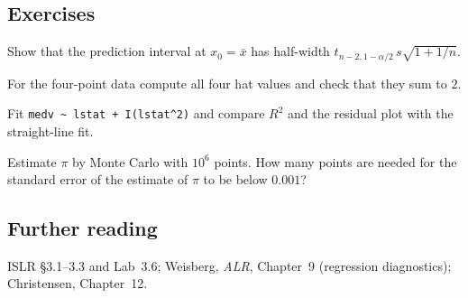 \subsection{Exercises}
\begin{problem}\label{prob:L18-1}
Show that the prediction interval at $x_0=\bar x$ has half-width $t_{n-2,1-\alpha/2}\,s\sqrt{1+1/n}$.
\end{problem}
\begin{problem}\label{prob:L18-2}
For the four-point data compute all four hat values and check that they sum to $2$.
\end{problem}
\begin{problem}\label{prob:L18-3}
Fit \texttt{medv \textasciitilde\ lstat + I(lstat\textasciicircum2)} and compare $R^2$ and the residual plot with the straight-line fit.
\end{problem}
\begin{problem}\label{prob:L18-4}
Estimate $\pi$ by Monte Carlo with $10^6$ points. How many points are needed for the standard error of the estimate of $\pi$ to be below $0.001$?
\end{problem}

\subsection{Further reading}
ISLR \S3.1--3.3 and Lab~3.6; Weisberg, \emph{ALR}, Chapter~9 (regression diagnostics); Christensen, Chapter~12.
